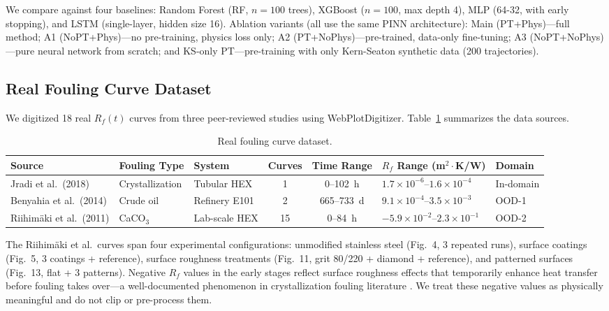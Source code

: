 \documentclass[review]{elsarticle}
\begin{document}
We compare against four baselines: Random Forest (RF, $n=100$ trees), XGBoost ($n=100$, max depth 4), MLP (64-32, with early stopping), and LSTM (single-layer, hidden size 16). Ablation variants (all use the same PINN architecture): Main (PT+Phys)---full method; A1 (NoPT+Phys)---no pre-training, physics loss only; A2 (PT+NoPhys)---pre-trained, data-only fine-tuning; A3 (NoPT+NoPhys)---pure neural network from scratch; and KS-only PT---pre-training with only Kern-Seaton synthetic data (200 trajectories).

\subsection{Real Fouling Curve Dataset}

We digitized 18 real $R_f(t)$ curves from three peer-reviewed studies using WebPlotDigitizer. Table~\ref{tab:dataset} summarizes the data sources.

\begin{table}[htbp]
\centering
\caption{Real fouling curve dataset.}
\label{tab:dataset}
\begin{tabular}{@{}p{2.8cm}p{2.2cm}p{2.2cm}ccp{2.3cm}p{1.5cm}@{}}
\toprule
Source & Fouling Type & System & Curves & Time Range & $R_f$ Range (m$^2\cdot$K/W) & Domain \\
\midrule
Jradi et al.\ (2018) \cite{jradi2018tubular} & Crystallization & Tubular HEX & 1 & 0--102~h & $1.7\!\times\!10^{-6}$--$1.6\!\times\!10^{-4}$ & In-domain \\
Benyahia et al.\ (2014) \cite{benyahia2014study} & Crude oil & Refinery E101 & 2 & 665--733~d & $9.1\!\times\!10^{-4}$--$3.5\!\times\!10^{-3}$ & OOD-1 \\
Riihim\"aki et al.\ (2011) \cite{riihimaki2011crystallization} & CaCO$_3$ & Lab-scale HEX & 15 & 0--84~h & $-5.9\!\times\!10^{-2}$--$2.3\!\times\!10^{-1}$ & OOD-2 \\
\bottomrule
\end{tabular}
\end{table}

The Riihim\"aki et al.\ curves span four experimental configurations: unmodified stainless steel (Fig.\ 4, 3 repeated runs), surface coatings (Fig.\ 5, 3 coatings + reference), surface roughness treatments (Fig.\ 11, grit 80/220 + diamond + reference), and patterned surfaces (Fig.\ 13, flat + 3 patterns). Negative $R_f$ values in the early stages reflect surface roughness effects that temporarily enhance heat transfer before fouling takes over---a well-documented phenomenon in crystallization fouling literature \cite{epstein1983thinking}. We treat these negative values as physically meaningful and do not clip or pre-process them.
\end{document}
